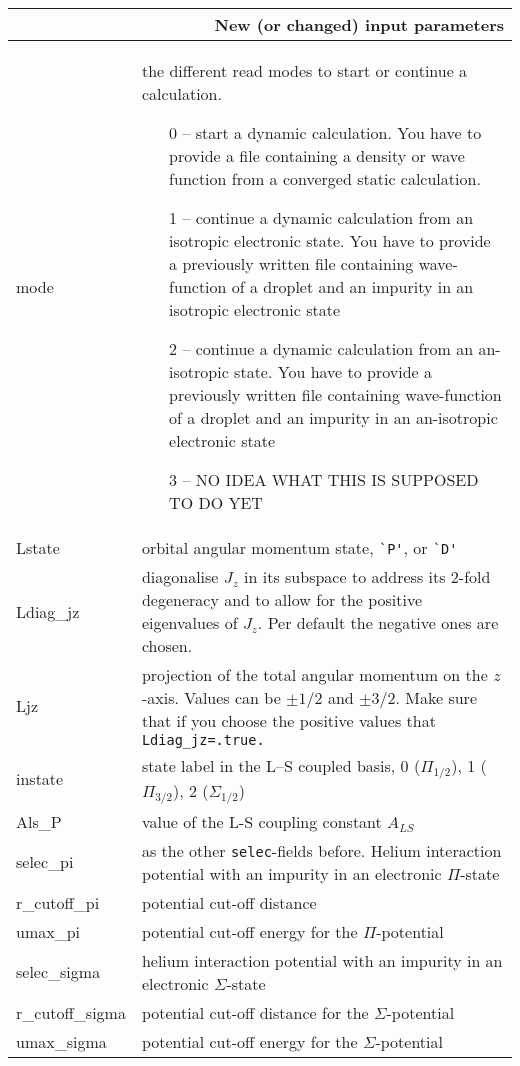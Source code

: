 \documentclass[10pt,a4paper]{article}
\begin{document}
	\begin{center}
		\begin{tabular}{l|p{8.0cm}}
			\multicolumn{2}{r}{\textbf{New (or changed) input parameters}} \\
			\hline\hline
			mode	& the different read modes to start or continue a calculation.
			\begin{enumerate}
				\item[0 --] start a dynamic calculation. You have to provide a file containing a density or wave function from a converged static calculation. 
				\item[1 --] continue a dynamic calculation from an isotropic electronic state. You have to provide a previously written file containing wave-function of a droplet and an impurity in an isotropic electronic state
				\item[2 --] continue a dynamic calculation from an an-isotropic state. You have to provide a previously written file containing wave-function of a droplet and an impurity in an an-isotropic electronic state
				\item [3 --] {\color{red}NO IDEA WHAT THIS IS SUPPOSED TO DO YET}
			\end{enumerate} \\			
			Lstate	& orbital angular momentum state, \verb|`P'|, or \verb|`D'| \\
			Ldiag\_jz	& diagonalise $J_z$ in its subspace to address its 2-fold degeneracy and to allow for the positive eigenvalues of $J_z$. Per default the negative ones are chosen. \\
			Ljz	& projection of the total angular momentum on the $z$-axis. Values can be $\pm 1/2$ and $\pm 3/2$. Make sure that if you choose the positive values that \verb|Ldiag_jz=.true.| \\
			instate	& state label in the L--S coupled basis, 0 ($\Pi_{1/2}$), 1 ($\Pi_{3/2}$), 2 ($\Sigma_{1/2}$) \\
			Als\_P	& value of the L-S coupling constant $A_{LS}$\\
			selec\_pi	& as the other \verb|selec|-fields before. Helium interaction potential with an impurity in an electronic $\Pi$-state \\
			r\_cutoff\_pi	& potential cut-off distance \\
			umax\_pi	& potential cut-off energy for the $\Pi$-potential \\
			selec\_sigma	& helium interaction potential with an impurity in an electronic $\Sigma$-state \\
			r\_cutoff\_sigma	& potential cut-off distance  for the $\Sigma$-potential\\
			umax\_sigma	& potential cut-off energy for the $\Sigma$-potential \\
		\end{tabular}
	\end{center}
	
\end{document}
